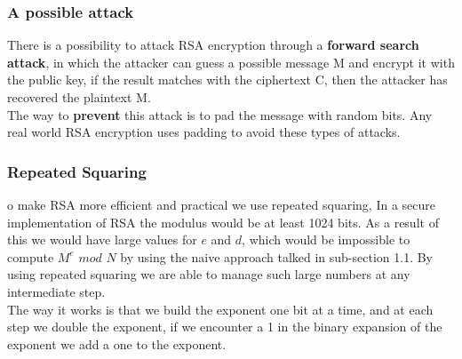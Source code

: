 \documentclass{article}
\begin{document}
\subsubsection{A possible attack}
There is a possibility to attack RSA encryption through a \textbf{forward search attack}, in which the attacker can guess a possible message M and encrypt it with the public key, if the result matches with the ciphertext C, then the attacker has recovered the plaintext M.\\
The way to \textbf{prevent} this attack is to pad the message with random bits. Any real world RSA encryption uses padding to avoid these types of attacks.

\subsubsection{Repeated Squaring}
o make RSA more efficient and practical we use repeated squaring, In a secure implementation of RSA the modulus would be at least 1024 bits. As a result of this we would have large values for $e$ and $d$, which would be impossible to compute $M^e$ $mod$ $N$ by using the naive approach talked in sub-section 1.1. By using repeated squaring we are able to manage such large numbers at any intermediate step.\\
The way it works is that we build the exponent one bit at a time, and at each step we double the exponent, if we encounter a 1 in the binary expansion of the exponent we add a one to the exponent.
\end{document}

